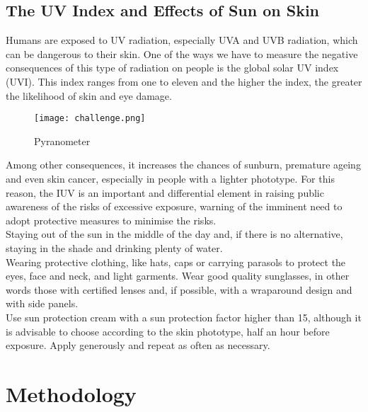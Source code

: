\documentclass[12pt,a4paper]{report}
\begin{document}
\section{The UV Index and Effects of Sun on Skin}
Humans are exposed to UV radiation, especially UVA and UVB radiation, 
which can be dangerous to their skin. One of the ways we have to measure the negative 
consequences of this type of radiation on people is the global solar UV index 
(UVI). This index ranges from one to eleven and the higher the index, the greater the 
likelihood of skin and eye damage.
\begin{figure} [!ht]
    \centering
    \texttt{[image: challenge.png]}
    \caption{Pyranometer}
    \label{fig:enter-label}
\end{figure}
Among other consequences, it increases the chances of sunburn, premature ageing and 
even skin cancer, especially in people with a lighter phototype. For this reason, the IUV 
is an important and differential element in raising public awareness of the risks of 
excessive exposure, warning of the imminent need to adopt protective measures to 
minimise the risks.\\
Staying out of the sun in the middle of the day and, if there is no alternative, staying in 
the shade and drinking plenty of water.\\
Wearing protective clothing, like hats, caps or carrying parasols to protect the eyes, face 
and neck, and light garments.
Wear good quality sunglasses, in other words those with certified lenses and, if possible, 
with a wraparound design and with side panels.\\
Use sun protection cream with a sun protection factor higher than 15, although it is
advisable to choose according to the skin phototype, half an hour before exposure. 
Apply generously and repeat as often as necessary.\\
\chapter{Methodology} 
\end{document}
